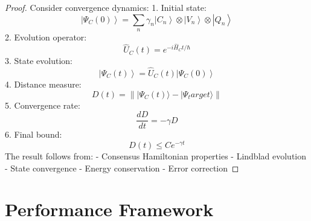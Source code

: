 \documentclass[12pt]{article}
\newcommand{\ket}[1]{\left|#1\right\rangle}
\newcommand{\op}[1]{\hat{#1}}
\begin{document}
\begin{proof}
Consider convergence dynamics:
1. Initial state:
\begin{equation}
\ket{\Psi_C(0)} = \sum_n \gamma_n\ket{C_n} \otimes \ket{V_n} \otimes \ket{Q_n}
\end{equation}
2. Evolution operator:
\begin{equation}
\op{U}_C(t) = e^{-i\op{H}_Ct/\hbar}
\end{equation}
3. State evolution:
\begin{equation}
\ket{\Psi_C(t)} = \op{U}_C(t)\ket{\Psi_C(0)}
\end{equation}
4. Distance measure:
\begin{equation}
D(t) = \||\Psi_C(t)\rangle - |\Psi_target\rangle\|
\end{equation}
5. Convergence rate:
\begin{equation}
\frac{dD}{dt} = -\gamma D
\end{equation}
6. Final bound:
\begin{equation}
D(t) \leq Ce^{-\gamma t}
\end{equation}
The result follows from:
- Consensus Hamiltonian properties
- Lindblad evolution
- State convergence
- Energy conservation
- Error correction
\end{proof}
\section{Performance Framework}
\end{document}
